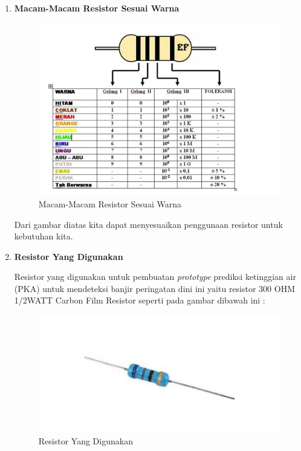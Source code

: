 \begin{enumerate}
\item \textbf{Macam-Macam Resistor Sesuai Warna}\\
\begin{figure}[H]
\centering
\includegraphics[width=1\textwidth]{figures/resistor2.png}
\caption{Macam-Macam Resistor Sesuai Warna}
\label{print}
\end{figure}

Dari gambar diatas kita dapat menyesuaikan penggunaan resistor untuk kebutuhan kita. 

\item \textbf{Resistor Yang Digunakan}
\par Resistor yang digunakan untuk pembuatan \textit{prototype} prediksi ketinggian air (PKA) untuk mendeteksi banjir peringatan dini ini yaitu resistor 300 OHM 1/2WATT Carbon Film Resistor seperti pada gambar dibawah ini :

\begin{figure}[H]
\centering
\includegraphics[width=1\textwidth]{figures/resistor.jpg}
\caption{Resistor Yang Digunakan}
\label{print}
\end{figure}


\end{enumerate}
